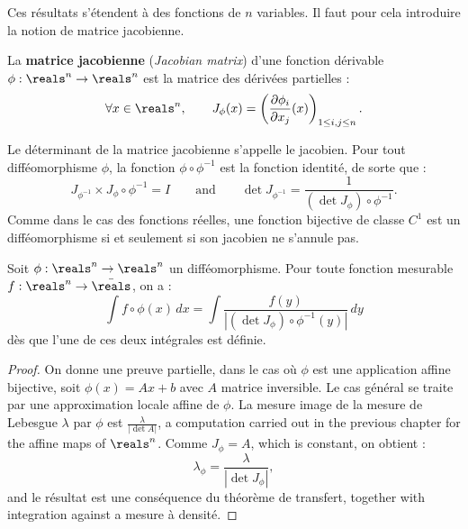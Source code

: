 Ces résultats s'étendent à des fonctions de $n$ variables. Il faut pour cela
introduire la notion de matrice jacobienne.

\begin{definition}
  La \textbf{matrice jacobienne} (\textit{Jacobian matrix}) d'une fonction dérivable
  $\phi : \reals^{n} \to \reals^{n}$ est la matrice des dérivées partielles :
  \[
    \forall x \in \reals^{n}, \qquad
    J_{\phi}(x) = \left( \frac{\partial \phi_{i}}{\partial x_{j}}(x)
      \right)_{1 \leq i,j \leq n} .
  \]
\end{definition}

Le déterminant de la matrice jacobienne s'appelle le jacobien. Pour tout
difféomorphisme $\phi$, la fonction $\phi \circ \phi^{-1}$ est la fonction identité,
de sorte que :
\[
  J_{\phi^{-1}} \times J_{\phi} \circ \phi^{-1} = I
  \qquad \text{and} \qquad
  \det J_{\phi^{-1}} = \frac{1}{(\det J_{\phi}) \circ \phi^{-1}} .
\]
Comme dans le cas des fonctions réelles, une fonction bijective de classe $C^{1}$ est
un difféomorphisme si et seulement si son jacobien ne s'annule pas.

\begin{theorem}
  Soit $\phi : \reals^{n} \to \reals^{n}$ un difféomorphisme. Pour toute fonction
  mesurable $f : \reals^{n} \to \bar{\reals}$, on a :
  \[
    \int f \circ \phi(x) \, dx
    = \int \frac{f(y)}{|(\det J_{\phi}) \circ \phi^{-1}(y)|} \, dy
  \]
  dès que l'une de ces deux intégrales est définie.
\end{theorem}

\begin{proof}
  On donne une preuve partielle, dans le cas où $\phi$ est une application affine
  bijective, soit $\phi(x) = Ax + b$ avec $A$ matrice inversible. Le cas général se
  traite par une approximation locale affine de $\phi$. La mesure image de la mesure
  de Lebesgue $\lambda$ par $\phi$ est $\frac{\lambda}{|\det A|}$, a computation
  carried out in the previous chapter for the affine maps of $\reals^{n}$. Comme
  $J_{\phi} = A$, which is constant, on obtient :
  \[
    \lambda_{\phi} = \frac{\lambda}{|\det J_{\phi}|} ,
  \]
  and le résultat est une conséquence du théorème de transfert, together with
  integration against a mesure à densité.
\end{proof}

